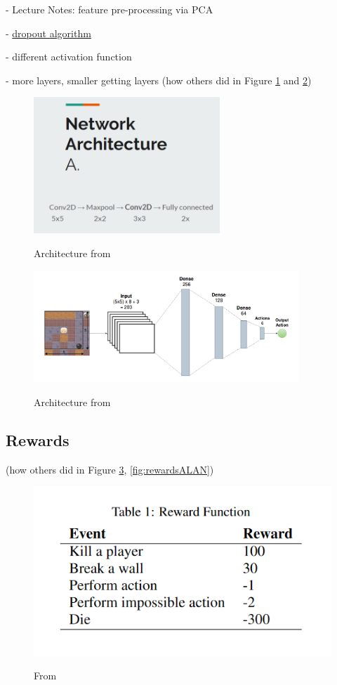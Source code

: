 \documentclass[a4paper ,12pt]{report}
\begin{document}
	- Lecture Notes: feature pre-processing via PCA
	
	- \href{https://wandb.ai/authors/ayusht/reports/Dropout-in-PyTorch-An-Example--VmlldzoxNTgwOTE}{dropout algorithm}
	
	- different activation function
	
	- more layers, smaller getting layers (how others did in Figure \ref{fig:arch1} and \ref{fig:arch2})
	
	\begin{figure}[ht]
		\caption{Architecture from \cite{AlanPresentation}}
		\includegraphics[width=7cm]{architecture.png}
		\label{fig:arch1}
	\end{figure}

	\begin{figure}[ht]
		\caption{Architecture from \cite{Pommerman}}
		\includegraphics[width=10cm]{architecture_2.png}
		\label{fig:arch2}
	\end{figure}
	
	\subsection*{Rewards}
	
	(how others did in Figure \ref{fig:rewards}, \ref{fig:rewardsALAN})
	
	\begin{figure}[ht]
		\caption{From \cite{GoulartBomberman}}
		\includegraphics{rewards.png}
		\label{fig:rewards}
	\end{figure}
\end{document}
